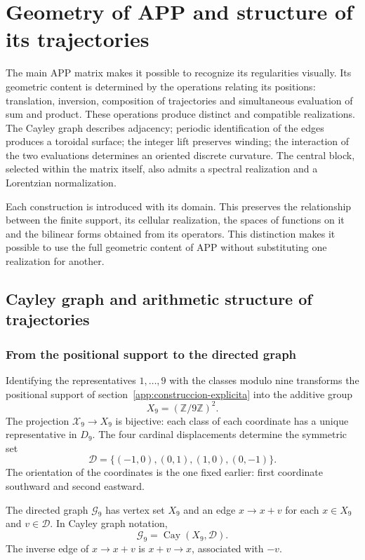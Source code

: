 \section{Geometry of APP and structure of its trajectories}
\label{geo:chap}

The main APP matrix makes it possible to recognize its regularities visually. Its geometric content is determined by the operations relating its positions: translation, inversion, composition of trajectories and simultaneous evaluation of sum and product. These operations produce distinct and compatible realizations. The Cayley graph describes adjacency; periodic identification of the edges produces a toroidal surface; the integer lift preserves winding; the interaction of the two evaluations determines an oriented discrete curvature. The central block, selected within the matrix itself, also admits a spectral realization and a Lorentzian normalization.

Each construction is introduced with its domain. This preserves the relationship between the finite support, its cellular realization, the spaces of functions on it and the bilinear forms obtained from its operators. This distinction makes it possible to use the full geometric content of APP without substituting one realization for another.

\subsection{Cayley graph and arithmetic structure of trajectories}
\label{geo:cayley}

\subsubsection{From the positional support to the directed graph}

Identifying the representatives $1,\ldots,9$ with the classes modulo nine transforms the positional support of section~\ref{app:construccion-explicita} into the additive group
\[
 X_9=(\mathbb Z/9\mathbb Z)^2.
\]
The projection $\mathcal X_9\to X_9$ is bijective: each class of each coordinate has a unique representative in $D_9$. The four cardinal displacements determine the symmetric set
\[
 \mathscr D=\{(-1,0),(0,1),(1,0),(0,-1)\}.
\]
The orientation of the coordinates is the one fixed earlier: first coordinate southward and second eastward.

\begin{definicion}
\label{geo:def-grafo}
The directed graph $\mathscr G_9$ has vertex set $X_9$ and an edge $x\to x+v$ for each $x\in X_9$ and $v\in\mathscr D$. In Cayley graph notation,
\[
 \mathscr G_9=\operatorname{Cay}(X_9,\mathscr D).
\]
The inverse edge of $x\to x+v$ is $x+v\to x$, associated with $-v$.
\end{definicion}


